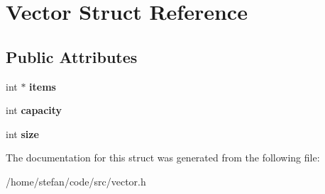 \hypertarget{structVector}{}\section{Vector Struct Reference}
\label{structVector}
\subsection*{Public Attributes}
\begin{DoxyCompactItemize}
\item 
\mbox{\label{structVector_ae543ea4cf854da976f8627018b8eebf2}} 
int $\ast$ {\bfseries items}
\item 
\mbox{\label{structVector_a6d49b240ab4a8ccb9b1c7297e78511da}} 
int {\bfseries capacity}
\item 
\mbox{\label{structVector_ae13c6e730a6558ba444beb8f7e44d4ca}} 
int {\bfseries size}
\end{DoxyCompactItemize}


The documentation for this struct was generated from the following file\+:\begin{DoxyCompactItemize}
\item 
/home/stefan/code/src/vector.\+h\end{DoxyCompactItemize}
